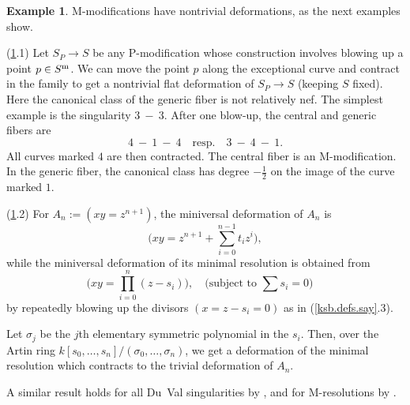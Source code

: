 \documentclass{amsart}
\theoremstyle{definition}
\newtheorem{exmp}[thm]{Example}
\theoremstyle{remark}
\newcommand{\qtq}[1]{\quad\mbox{#1}\quad}
\newcommand{\tsum}[0]{\textstyle{\sum}}
\newcommand{\tprod}[0]{\textstyle{\prod}}
\begin{document}
 \begin{exmp}\label{An.mines.exmp} M-modifications have nontrivial deformations, as
   the next examples show.

   (\ref{An.mines.exmp}.1)  Let $S_P\to S$ be any P-modification whose construction involves blowing up a point  $p\in S^{\rm m}$. We can move the point
   $p$ along the exceptional curve and contract in the family to get a
   nontrivial flat deformation of $S_P\to S$ (keeping $S$ fixed).
   Here the canonical class of the generic fiber is not relatively nef.
   The simplest example is  the singularity $3\ -\ 3$. After one blow-up, the central and generic fibers are
   $$
   4\ -\ 1\ -\ 4 \qtq{resp.}   3\ -\ 4\ -\ 1.
   $$
   All curves marked $4$ are then contracted. The central fiber is an 
   M-modification. In the generic fiber, the canonical class has degree $-\frac12$ on the image of the
   curve marked $1$. 
   
    (\ref{An.mines.exmp}.2) For $A_n:=(xy=z^{n+1})$, the miniversal deformation of $A_n$ is
   $$
   \bigl(xy=z^{n+1}+\tsum_{i=0}^{n-1}t_iz^i\bigr),
   $$
   while the  miniversal deformation  of its minimal  resolution  is  obtained from 
   $$
   \bigl(xy=\tprod_{i=0}^{n}(z-s_i)\bigr), \qtq{(subject to $\tsum s_i=0$)}
   $$
   by  repeatedly blowing up the divisors $(x=z-s_i=0)$ as in (\ref{ksb.defs.say}.3).
   
   Let $\sigma_j$ be the $j$th elementary symmetric polynomial in the $s_i$.
   Then, over the Artin ring  $k[s_0,\dots, s_n]/(\sigma_0, \dots, \sigma_n)$, we get
   a   deformation  of the minimal  resolution which contracts to the
   trivial deformation of  $A_n$.

   A similar result holds for all  Du~Val singularities by \cite{art-bri},
   and for M-resolutions by \cite{be-ch}.
   \end{exmp}



 

\end{document}
